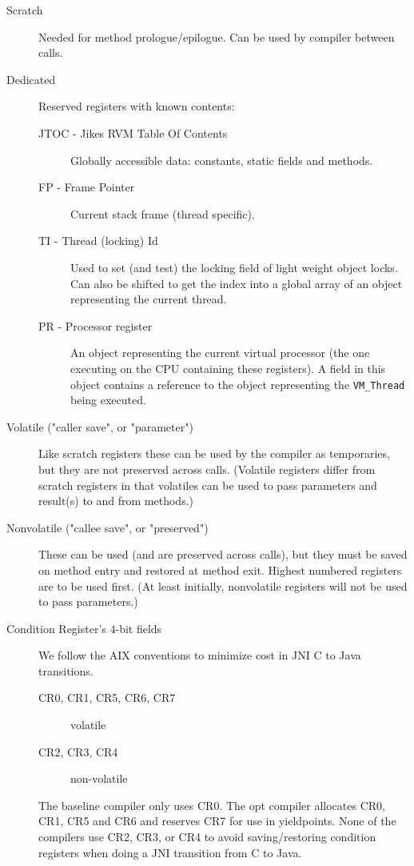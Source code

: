 \begin{description}
\item [Scratch]
     Needed for method prologue/epilogue.  Can be used by compiler between
     calls.

\item[Dedicated]
     Reserved registers with known contents:
\begin{description}
\item [JTOC - Jikes RVM Table Of Contents]
        Globally accessible data: constants, static fields and methods.

\item [FP - Frame Pointer]
        Current stack frame (thread specific).

\item [TI - Thread (locking) Id]
        Used to set (and test) the locking field of light weight object
        locks.  Can also be shifted to get the index into a global
        array of an object representing the current thread.

\item [PR - Processor register]
        An object representing the current virtual processor (the one
        executing on the CPU containing these registers).  A field in
        this object contains a reference to the object representing
        the {\tt VM\_Thread} being executed.
\end{description}

\item [Volatile ("caller save", or "parameter")]
     Like scratch registers these can be used by the compiler as
     temporaries, but they are not preserved across calls.  (Volatile
     registers differ from scratch registers in that volatiles
     can be used to pass parameters and result(s) to and from
     methods.)

\item [Nonvolatile ("callee save", or "preserved")]
     These can be used (and are preserved across calls), but they must be
     saved on method entry and restored at method exit.  Highest numbered
     registers are to be used first.  (At least initially, nonvolatile
     registers will not be used to pass parameters.)

\item[Condition Register's 4-bit fields]
We follow the AIX conventions to minimize cost in JNI C to Java
transitions. 
\begin{description}
\item    [CR0, CR1, CR5, CR6, CR7] volatile
\item    [CR2, CR3, CR4] non-volatile
\end{description}
The baseline compiler only uses CR0.  The opt compiler allocates CR0,
CR1, CR5 and CR6 and reserves CR7 for use in yieldpoints.  None of the
compilers use CR2, CR3, or CR4 to avoid saving/restoring condition
registers when doing a JNI transition from C to Java. 
\end{description}


